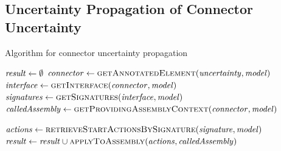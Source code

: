 \subsection{Uncertainty Propagation of Connector Uncertainty}

\begin{algorithm}
    \caption{Algorithm for connector uncertainty propagation}
    \label{alg:impactanalysis:connector}
    \begin{algorithmic}[1]
            \algindentskip
            \State $\mathit{result} \gets \emptyset$
            \State $\mathit{connector} \gets \textsc{getAnnotatedElement}(\mathit{uncertainty}, \mathit{model})$
            \State $\mathit{interface} \gets \textsc{getInterface}(\mathit{connector}, \mathit{model})$ \label{alg:impactanalysis:connector:4}
            \State $\mathit{signatures} \gets \textsc{getSignatures}(\mathit{interface}, \mathit{model})$
            \State $\mathit{calledAssembly} \gets \textsc{getProvidingAssemblyContext}(\mathit{connector}, \mathit{model})$ \label{alg:impactanalysis:connector:6}
            \algblockskip

               \label{alg:impactanalysis:connector:7}
                \State $\mathit{actions} \gets \textsc{retrieveStartActionsBySignature}(\mathit{signature}, \mathit{model})$
                \State $\mathit{result} \gets \mathit{result} \cup \textsc{applyToAssembly}(\mathit{actions},\mathit{calledAssembly})$ \label{alg:impactanalysis:connector:9}
            \EndFor
            \algblockskip


\end{algorithmic}
\end{algorithm}

